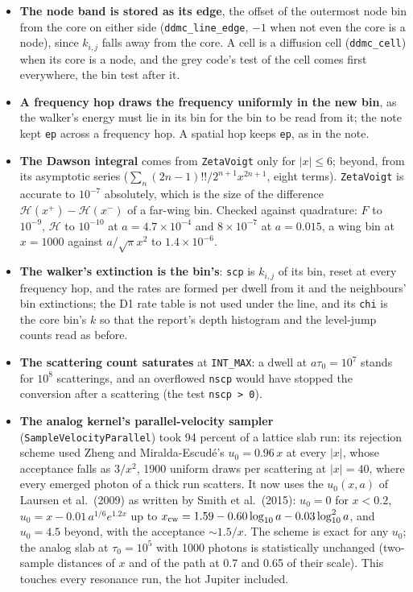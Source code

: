 \documentclass[11pt]{article}
\newcommand{\key}[1]{\texttt{#1}}
\begin{document}
\begin{itemize}
  beyond \key{xmax}.
\item \textbf{The node band is stored as its edge}, the offset of the outermost node
  bin from the core on either side (\texttt{ddmc\_line\_edge}, $-1$ when not even the
  core is a node), since $k_{i,j}$ falls away from the core.  A cell is a diffusion
  cell (\texttt{ddmc\_cell}) when its core is a node, and the grey code's test of the
  cell comes first everywhere, the bin test after it.
\item \textbf{A frequency hop draws the frequency uniformly in the new bin}, as the
  walker's energy must lie in its bin for the bin to be read from it; the note kept
  \texttt{ep} across a frequency hop.  A spatial hop keeps \texttt{ep}, as in the note.
\item \textbf{The Dawson integral} comes from \texttt{ZetaVoigt} only for $|x| \le 6$;
  beyond, from its asymptotic series ($\sum_n (2n-1)!!/2^{n+1}x^{2n+1}$, eight terms).
  \texttt{ZetaVoigt} is accurate to $10^{-7}$ absolutely, which is the size of the
  difference $\mathcal{H}(x^+) - \mathcal{H}(x^-)$ of a far-wing bin.  Checked against
  quadrature: $F$ to $10^{-9}$, $\mathcal{H}$ to $10^{-10}$ at $a = 4.7\times10^{-4}$
  and $8\times10^{-7}$ at $a = 0.015$, a wing bin at $x = 1000$ against $a/\sqrt\pi
  x^2$ to $1.4\times10^{-6}$.
\item \textbf{The walker's extinction is the bin's}: \texttt{scp} is $k_{i,j}$ of its
  bin, reset at every frequency hop, and the rates are formed per dwell from it and
  the neighbours' bin extinctions; the D1 rate table is not used under the line, and
  its \texttt{chi} is the core bin's $k$ so that the report's depth histogram and the
  level-jump counts read as before.
\item \textbf{The scattering count saturates} at \texttt{INT\_MAX}: a dwell at
  $a\tau_0 = 10^7$ stands for $10^8$ scatterings, and an overflowed \texttt{nscp} would
  have stopped the conversion after a scattering (the test \texttt{nscp > 0}).
\item \textbf{The analog kernel's parallel-velocity sampler}
  (\texttt{SampleVelocityParallel}) took 94 percent of a lattice slab run: its
  rejection scheme used Zheng and Miralda-Escud\'e's $u_0 = 0.96\,x$ at every $|x|$,
  whose acceptance falls as $3/x^2$, 1900 uniform draws per scattering at $|x| = 40$,
  where every emerged photon of a thick run scatters.  It now uses the $u_0(x, a)$ of
  Laursen et al.\ (2009) as written by Smith et al.\ (2015): $u_0 = 0$ for $x < 0.2$,
  $u_0 = x - 0.01\,a^{1/6}e^{1.2x}$ up to $x_{\rm cw} = 1.59 - 0.60\log_{10}a -
  0.03\log_{10}^2 a$, and $u_0 = 4.5$ beyond, with the acceptance $\sim 1.5/x$.  The
  scheme is exact for any $u_0$; the analog slab at $\tau_0 = 10^5$ with 1000 photons
  is statistically unchanged (two-sample distances of $x$ and of the path at 0.7 and
  0.65 of their scale).  This touches every resonance run, the hot Jupiter included.
\end{itemize}
\end{document}
